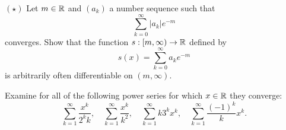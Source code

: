 \documentclass[week=12]{homework}
\begin{document}
\begin{questions}
		\question
		$(\star)$ Let $m \in \mathbb{R}$ and $(a_k)$ a number sequence such that 
		\[
			\sum_{k=0}^{\infty} |a_k|e^{-m}
		\]
		converges. Show that the function $s : [m,\infty) \to \mathbb{R}$ defined by 
		\[
			s(x) = \sum_{k=0}^{\infty} a_k e^{-m}
		\] 
		is arbitrarily often differentiable on $(m,\infty)$. 

	     \question
	     Examine for all of the following power series for which $x \in \mathbb{R}$ they converge:
	     \[
	     \sum_{k=1}^{\infty} \frac{x^k}{2^k k}, \quad 
	     \sum_{k=1}^{\infty} \frac{x^k}{k^2}, \quad
	     \sum_{k=1}^{\infty} k 3^k x^k, \quad 
	     \sum_{k=1}^{\infty} \frac{(-1)^k}{k} x^k.
	     \]
     \end{questions}
\end{document}
